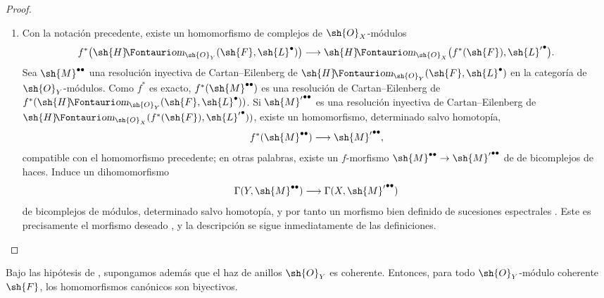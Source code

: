 \documentclass[oneside]{amsart}
\makeatletter
\newcommand{\ega@arrow}[2]{\mathchoice{#1}{#2}{#2}{#2}}
\renewcommand{\to}{\ega@arrow{\longrightarrow}{\rightarrow}}
\newcommand*{\ega@sheafop}[3]{\sh{#1}#2\textup{\kern-2.2pt{\Fontauri\slshape #3}}}
\newcommand*{\shHom}{\ega@sheafop{H}{}{om}}
\let\EGAOriginalLabel\label
\renewcommand{\label}[1]{\phantomsection\EGAOriginalLabel{#1}}
\makeatother
\begin{document}
\begin{proof}
\begin{enumerate}
  \item[\rm(ii)]
  Con la notación precedente, existe un homomorfismo de complejos de
  $\sh{O}_X$-módulos
  \[
    f^*\bigl(\shHom_{\sh{O}_Y}(\sh{F},\sh{L}^\bullet)\bigr)
    \longrightarrow
    \shHom_{\sh{O}_X}
      \bigl(f^*(\sh{F}),{\sh{L}'}^\bullet\bigr).
  \]
  Sea $\sh{M}^{\bullet\bullet}$ una resolución inyectiva de
  Cartan--Eilenberg de
  $\shHom_{\sh{O}_Y}(\sh{F},\sh{L}^\bullet)$ en la categoría de
  $\sh{O}_Y$-módulos.  Como $f^*$ es exacto,
  $f^*(\sh{M}^{\bullet\bullet})$ es una resolución de Cartan--Eilenberg de
  $f^*(\shHom_{\sh{O}_Y}(\sh{F},\sh{L}^\bullet))$.
  Si ${\sh{M}'}^{\bullet\bullet}$ es una resolución inyectiva de
  Cartan--Eilenberg de
  $\shHom_{\sh{O}_X}(f^*(\sh{F}),{\sh{L}'}^\bullet))$, existe
   un homomorfismo, determinado salvo homotopía,
  \[
    f^*(\sh{M}^{\bullet\bullet})
    \longrightarrow{\sh{M}'}^{\bullet\bullet},
  \]
  compatible con el homomorfismo precedente; en otras palabras, existe
  un $f$-morfismo
  $\sh{M}^{\bullet\bullet}\to{\sh{M}'}^{\bullet\bullet}$ de
  de bicomplejos de haces.
  Induce un dihomomorfismo
  \[
    \Gamma(Y,\sh{M}^{\bullet\bullet})
    \longrightarrow\Gamma(X,{\sh{M}'}^{\bullet\bullet})
  \]
  de bicomplejos de módulos, determinado salvo homotopía, y por tanto
  un morfismo bien definido de sucesiones espectrales
  .  Este es precisamente el morfismo deseado
  , y la descripción
   se sigue inmediatamente de las definiciones.
\end{enumerate}
\end{proof}

\begin{proposition}[12.3.5]
\label{0.12.3.5}
Bajo las hipótesis de , supongamos además que el
haz de anillos $\sh{O}_Y$ es coherente.
Entonces, para todo $\sh{O}_Y$-módulo coherente $\sh{F}$, los
homomorfismos canónicos  son biyectivos.
\end{proposition}
\end{document}
